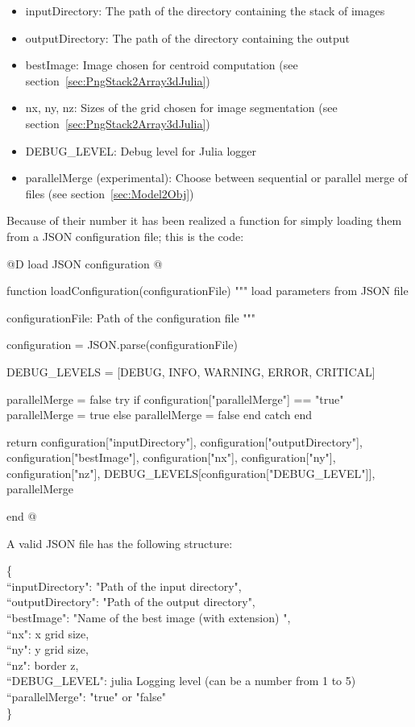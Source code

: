 \documentclass[11pt,oneside]{article}	%
\begin{document}
\begin{itemize}
 \item inputDirectory: The path of the directory containing the stack of images
 \item outputDirectory: The path of the directory containing the output
 \item bestImage: Image chosen for centroid computation (see section~\ref{sec:PngStack2Array3dJulia})
 \item nx, ny, nz: Sizes of the grid chosen for image segmentation (see section~\ref{sec:PngStack2Array3dJulia})
 \item DEBUG\_LEVEL: Debug level for Julia logger
 \item parallelMerge (experimental): Choose between sequential or parallel merge of files (see section~\ref{sec:Model2Obj})
\end{itemize}

Because of their number it has been realized a function for simply loading them from a JSON configuration file; this is the code:

@D load JSON configuration
@{function loadConfiguration(configurationFile)
  """
  load parameters from JSON file

  configurationFile: Path of the configuration file
  """

  configuration = JSON.parse(configurationFile)

  DEBUG_LEVELS = [DEBUG, INFO, WARNING, ERROR, CRITICAL]

  parallelMerge = false
  try
    if configuration["parallelMerge"] == "true"
      parallelMerge = true
    else
      parallelMerge = false
    end
  catch
  end

  return configuration["inputDirectory"], configuration["outputDirectory"],
	configuration["bestImage"],
        configuration["nx"], configuration["ny"], configuration["nz"],
        DEBUG_LEVELS[configuration["DEBUG_LEVEL"]],
        parallelMerge

end
@}

A valid JSON file has the following structure:
\begin{tabbing}
\{ \= \\
\>  ``inputDirectory": "Path of the input directory",\\
\>  ``outputDirectory": "Path of the output directory",\\
\>  ``bestImage": "Name of the best image (with extension) ",\\
\>  ``nx": x grid size,\\
\>  ``ny": y grid size,\\
\>  ``nz": border z,\\
\>  ``DEBUG\_LEVEL": julia Logging level (can be a number from 1 to 5)\\
\>  ``parallelMerge": "true" or "false" \\
\}\\
\end{tabbing}
\end{document}
